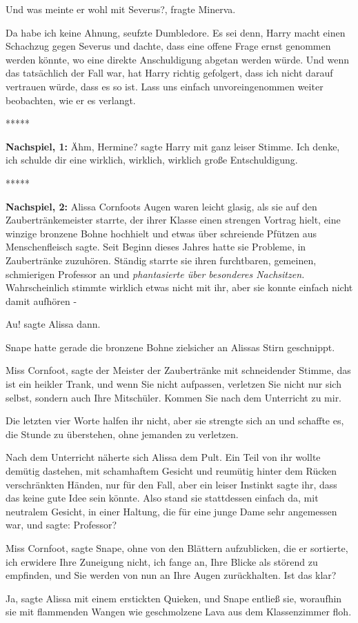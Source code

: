 \glqq{}Und was meinte er wohl mit Severus?\grqq{}, fragte Minerva.

\glqq{}Da habe ich keine Ahnung\grqq{}, seufzte Dumbledore. \glqq{}Es sei denn,
Harry macht einen Schachzug gegen Severus und dachte, dass eine offene Frage
ernst genommen werden könnte, wo eine direkte Anschuldigung abgetan werden
würde. Und wenn das tatsächlich der Fall war, hat Harry richtig gefolgert, dass
ich nicht darauf vertrauen würde, dass es so ist. Lass uns einfach
unvoreingenommen weiter beobachten, wie er es verlangt.\grqq{}

\begin{center}*****\end{center}

\textbf{Nachspiel, 1:}
\glqq{}Ähm, Hermine?\grqq{} sagte Harry mit ganz leiser Stimme. \glqq{}Ich
denke, ich schulde dir eine wirklich, wirklich, wirklich große
Entschuldigung.\grqq{}

\begin{center}*****\end{center}

\textbf{Nachspiel, 2:}
Alissa Cornfoots Augen waren leicht glasig, als sie auf den Zaubertränkemeister
starrte, der ihrer Klasse einen strengen Vortrag hielt, eine winzige bronzene
Bohne hochhielt und etwas über schreiende Pfützen aus Menschenfleisch sagte.
Seit Beginn dieses Jahres hatte sie Probleme, in Zaubertränke zuzuhören. Ständig
starrte sie ihren furchtbaren, gemeinen, schmierigen Professor an und\emph{
phantasierte über besonderes Nachsitzen.} Wahrscheinlich stimmte wirklich etwas
nicht mit ihr, aber sie konnte einfach nicht damit aufhören -

\glqq{}Au!\grqq{} sagte Alissa dann.

Snape hatte gerade die bronzene Bohne zielsicher an Alissas Stirn geschnippt.

\glqq{}Miss Cornfoot\grqq{}, sagte der Meister der Zaubertränke mit schneidender
Stimme, \glqq{}das ist ein heikler Trank, und wenn Sie nicht aufpassen,
verletzen Sie nicht nur sich selbst, sondern auch Ihre Mitschüler. Kommen Sie
nach dem Unterricht zu mir.\grqq{}

Die letzten vier Worte halfen ihr nicht, aber sie strengte sich an und schaffte
es, die Stunde zu überstehen, ohne jemanden zu verletzen.

Nach dem Unterricht näherte sich Alissa dem Pult. Ein Teil von ihr wollte
demütig dastehen, mit schamhaftem Gesicht und reumütig hinter dem Rücken
verschränkten Händen, nur für den Fall, aber ein leiser Instinkt sagte ihr, dass
das keine gute Idee sein könnte. Also stand sie stattdessen einfach da, mit
neutralem Gesicht, in einer Haltung, die für eine junge Dame sehr angemessen
war, und sagte: \glqq{} Professor?\grqq{}

\glqq{}Miss Cornfoot\grqq{}, sagte Snape, ohne von den Blättern aufzublicken,
die er sortierte, \glqq{}ich erwidere Ihre Zuneigung nicht, ich fange an, Ihre
Blicke als störend zu empfinden, und Sie werden von nun an Ihre Augen
zurückhalten. Ist das klar?\grqq{}

\glqq{}Ja\grqq{}, sagte Alissa mit einem erstickten Quieken, und Snape entließ
sie, woraufhin sie mit flammenden Wangen wie geschmolzene Lava aus dem
Klassenzimmer floh.
